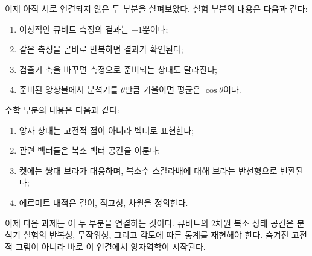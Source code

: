 이제 아직 서로 연결되지 않은 두 부분을 살펴보았다. 실험 부분의 내용은 다음과 같다:
\begin{enumerate}
  \item 이상적인 큐비트 측정의 결과는 \(\pm1\)뿐이다;
  \item 같은 측정을 곧바로 반복하면 결과가 확인된다;
  \item 검출기 축을 바꾸면 측정으로 준비되는 상태도 달라진다;
  \item 준비된 앙상블에서 분석기를 \(\theta\)만큼 기울이면 평균은 \(\cos\theta\)이다.
\end{enumerate}
수학 부분의 내용은 다음과 같다:
\begin{enumerate}
  \item 양자 상태는 고전적 점이 아니라 벡터로 표현한다;
  \item 관련 벡터들은 복소 벡터 공간을 이룬다;
  \item 켓에는 쌍대 브라가 대응하며, 복소수 스칼라배에 대해 브라는 반선형으로 변환된다;
  \item 에르미트 내적은 길이, 직교성, 차원을 정의한다.
\end{enumerate}

이제 다음 과제는 이 두 부분을 연결하는 것이다. 큐비트의 2차원 복소 상태 공간은 분석기 실험의 반복성, 무작위성, 그리고 각도에 따른 통계를 재현해야 한다. 숨겨진 고전적 그림이 아니라 바로 이 연결에서 양자역학이 시작된다.
